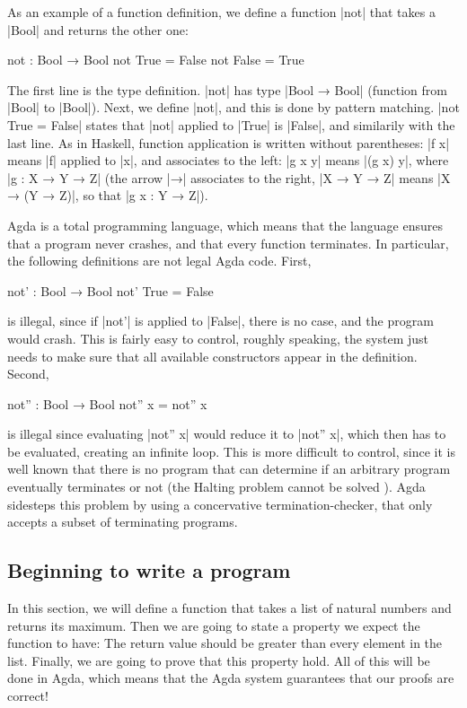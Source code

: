 As an example of a function definition, we define a function |not| that takes a |Bool| and returns the other one:
\begin{code}
not : Bool → Bool
not True = False
not False = True
\end{code}
The first line is the type definition. |not| has type |Bool → Bool| (function from |Bool| to |Bool|). Next, we define |not|, and this is done by pattern matching. |not True = False| states that |not| applied to |True| is |False|, and similarily with the last line. As in Haskell, function application is written without parentheses: |f x| means |f| applied to |x|, and associates to the left: |g x y| means |(g x) y|, where |g : X → Y → Z| (the arrow |→| associates to the right, |X → Y → Z| means |X → (Y → Z)|, so that |g x : Y → Z|).

Agda is a total programming language, which means that the language ensures that a program never crashes, and that every function terminates. In particular, the following definitions are not legal Agda code. First,
\begin{code}
not' : Bool → Bool
not' True = False
\end{code}
is illegal, since if |not'| is applied to |False|, there is no case, and the program would crash. This is fairly easy to control, roughly speaking, the system just needs to make sure that all available constructors appear in the definition. Second,
\begin{code}
not'' : Bool → Bool
not'' x = not'' x
\end{code}
is illegal since evaluating |not'' x| would reduce it to |not'' x|, which then has to be evaluated, creating an infinite loop. This is more difficult to control, since it is well known that there is no program that can determine if an arbitrary program eventually terminates or not (the Halting problem cannot be solved \cite{Turing}). Agda sidesteps this problem by using a concervative termination-checker, that only accepts a subset of terminating programs. %

\subsection{Beginning to write a program}
In this section, we will define a function that takes a list of natural numbers and returns its maximum. Then we are going to state a property we expect the function to have:  The return value should be greater than every element in the list.
Finally, we are going to prove that this property hold. All of this will be done in Agda, which means that the Agda system guarantees that our proofs are correct!

